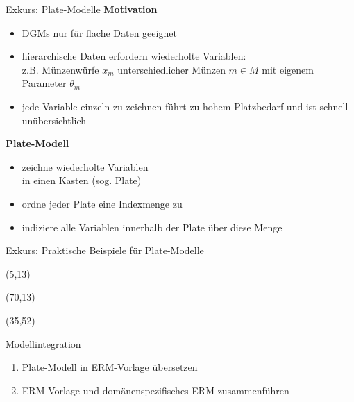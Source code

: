 \documentclass{beamer}
\newcommand{\adjustTikzSize}[0]{\Large}
\newcommand{\tikzScale}[0]{0.55}
\begin{document}
\begin{frame}{Exkurs: Plate-Modelle}
\textbf{Motivation}
\begin{itemize}
\item DGMs nur für flache Daten geeignet
\item hierarchische Daten erfordern wiederholte Variablen:\\
z.B. Münzenwürfe $x_m$ unterschiedlicher Münzen $m \in M$ mit eigenem Parameter $\theta_m$
\item jede Variable einzeln zu zeichnen führt zu hohem Platzbedarf und ist schnell unübersichtlich
\end{itemize}\pause

\vspace*{0.5em}
\textbf{Plate-Modell}
\begin{itemize}
\item zeichne wiederholte Variablen\\ in einen Kasten (sog. Plate)
\item ordne jeder Plate eine Indexmenge zu
\item indiziere alle Variablen innerhalb der Plate über diese Menge
\end{itemize}

\only<2>{
\begin{textblock}{10}(80,60)
	\scalebox{\tikzScale}{\adjustTikzSize }
\end{textblock}
}
\end{frame}

\begin{frame}{Exkurs: Praktische Beispiele für Plate-Modelle}
\begin{textblock}{10}(5,13)
	\scalebox{\tikzScale}{\adjustTikzSize }
\end{textblock}
\begin{textblock}{10}(70,13)
	\scalebox{\tikzScale}{\adjustTikzSize }
\end{textblock}
\begin{textblock}{10}(35,52)
	\scalebox{\tikzScale}{\adjustTikzSize }
\end{textblock}
\end{frame}

\begin{frame}[t]{Modellintegration}
\begin{center}
\scalebox{\tikzScale}{\adjustTikzSize }
\end{center}
\begin{enumerate}
\item Plate-Modell in ERM-Vorlage übersetzen
\item ERM-Vorlage und domänenspezifisches ERM zusammenführen
\end{enumerate}
\end{frame}
\end{document}
